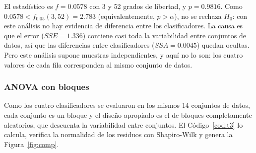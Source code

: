 \documentclass[11pt,letterpaper]{article}
\begin{document}
El estadístico es $f = 0.0578$ con 3 y 52 grados de libertad, y $p = 0.9816$. Como $0.0578 < f_{0.05}(3, 52) = 2.783$ (equivalentemente, $p > \alpha$), no se rechaza $H_0$: con este análisis no hay evidencia de diferencia entre los clasificadores. La causa es que el error ($SSE = 1.336$) contiene casi toda la variabilidad entre conjuntos de datos, así que las diferencias entre clasificadores ($SSA = 0.0045$) quedan ocultas. Pero este análisis supone muestras independientes, y aquí no lo son: los cuatro valores de cada fila corresponden al mismo conjunto de datos.

\subsubsection{ANOVA con bloques}

Como los cuatro clasificadores se evaluaron en los mismos 14 conjuntos de datos, cada conjunto es un bloque y el diseño apropiado es el de bloques completamente aleatorios, que descuenta la variabilidad entre conjuntos. El Código~\ref{cod:t3} lo calcula, verifica la normalidad de los residuos con Shapiro-Wilk y genera la Figura~\ref{fig:comp}.
\end{document}
